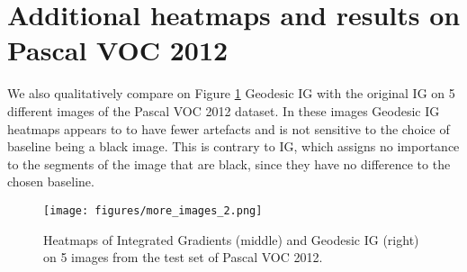 \section{Additional heatmaps and results on Pascal VOC 2012}
\label{app:voc}

We also qualitatively compare on Figure \ref{fig:more_images} Geodesic IG with the original IG on 5 different images of the Pascal VOC 2012 dataset. In these images Geodesic IG heatmaps appears to to have fewer artefacts and is not sensitive to the choice of baseline being a black image. This is contrary to IG, which assigns no importance to the segments of the image that are black, since they have no difference to the chosen baseline.

\begin{figure}[b!]
\begin{center}
\centerline{\texttt{[image: figures/more\_images\_2.png]}}
\caption{Heatmaps of Integrated Gradients (middle) and Geodesic IG (right) on 5 images from the test set of Pascal VOC 2012.}
\label{fig:more_images}
\end{center}
\end{figure}
